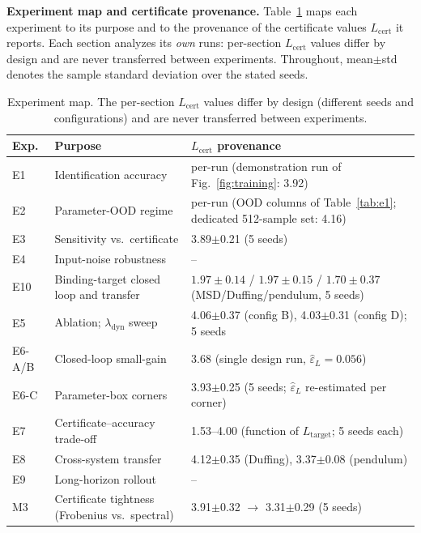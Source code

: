 \documentclass[11pt,sagev,times]{sagej}
\newcommand{\Lhat}{L_{\mathrm{cert}}}
\newcommand{\epsL}{\varepsilon_L}
\newcommand{\Ltarget}{L_{\mathrm{target}}}
\begin{document}
\textbf{Experiment map and certificate provenance.}
Table~\ref{tab:emap} maps each experiment to its purpose and to the
provenance of the certificate values $\Lhat$ it reports. Each section
analyzes its \emph{own} runs: per-section $\Lhat$ values differ by design and
are never transferred between experiments. Throughout, mean$\pm$std denotes the
sample standard deviation over the stated seeds.

\begin{table}[t]
\centering\small
\caption{Experiment map. The per-section $\Lhat$ values differ by design
(different seeds and configurations) and are never transferred between
experiments.}
\label{tab:emap}
\begin{tabular}{llp{5.4cm}}
\toprule
Exp. & Purpose & $\Lhat$ provenance \\
\midrule
E1 & Identification accuracy & per-run (demonstration run of Fig.~\ref{fig:training}: 3.92) \\
E2 & Parameter-OOD regime & per-run (OOD columns of Table~\ref{tab:e1}; dedicated 512-sample set: 4.16) \\
E3 & Sensitivity vs.\ certificate & 3.89$\pm$0.21 (5 seeds) \\
E4 & Input-noise robustness & -- \\
E10 & Binding-target closed loop and transfer & $1.97\pm0.14$ / $1.97\pm0.15$ / $1.70\pm0.37$ (MSD/Duffing/pendulum, 5 seeds) \\
E5 & Ablation; $\lambda_{\mathrm{dyn}}$ sweep & 4.06$\pm$0.37 (config B), 4.03$\pm$0.31 (config D); 5 seeds \\
E6-A/B & Closed-loop small-gain & 3.68 (single design run, $\hat\epsL=0.056$) \\
E6-C & Parameter-box corners & 3.93$\pm$0.25 (5 seeds; $\hat\epsL$ re-estimated per corner) \\
E7 & Certificate--accuracy trade-off & 1.53--4.00 (function of $\Ltarget$; 5 seeds each) \\
E8 & Cross-system transfer & 4.12$\pm$0.35 (Duffing), 3.37$\pm$0.08 (pendulum) \\
E9 & Long-horizon rollout & -- \\
M3 & Certificate tightness (Frobenius vs.\ spectral) & 3.91$\pm$0.32 $\to$ 3.31$\pm$0.29 (5 seeds) \\
\bottomrule
\end{tabular}
\end{table}
\end{document}
